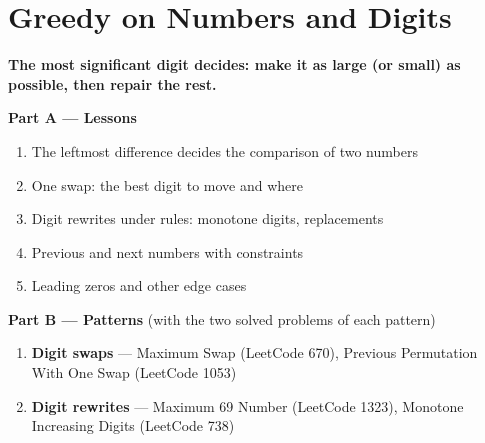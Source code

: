 \chapter{Greedy on Numbers and Digits}
\label{ch:digits}

\begin{tcolorbox}[enhanced, colback=white, colframe=secondaryblue, boxrule=1pt, arc=2mm]
\textbf{\large\textcolor{primaryblue}{The most significant digit decides: make it as large (or small) as possible, then repair the rest.}}
\end{tcolorbox}


\begin{plannedbox}
\textbf{Part A --- Lessons}
\begin{enumerate}[leftmargin=*, label=\textbf{A\arabic*.}, itemsep=1pt]
    \item The leftmost difference decides the comparison of two numbers
    \item One swap: the best digit to move and where
    \item Digit rewrites under rules: monotone digits, replacements
    \item Previous and next numbers with constraints
    \item Leading zeros and other edge cases
\end{enumerate}
\textbf{Part B --- Patterns} (with the two solved problems of each pattern)
\begin{enumerate}[leftmargin=*, label=\textbf{P\arabic*.}, itemsep=1pt]
    \item \textbf{Digit swaps} --- Maximum Swap {\small\color{darkgray}(LeetCode 670)}, Previous Permutation With One Swap {\small\color{darkgray}(LeetCode 1053)}
    \item \textbf{Digit rewrites} --- Maximum 69 Number {\small\color{darkgray}(LeetCode 1323)}, Monotone Increasing Digits {\small\color{darkgray}(LeetCode 738)}
\end{enumerate}
\end{plannedbox}
